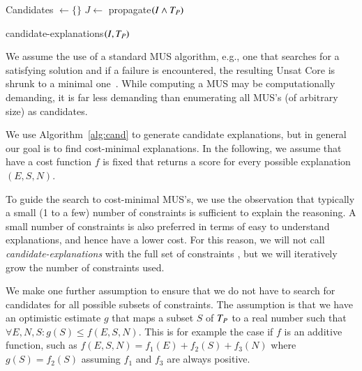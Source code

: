 \begin{algorithm}


  Candidates $\gets \{\}$\;
  $J \gets$ propagate$(I \wedge T_P)$\;
  \caption{candidate-explanations$(I,T_P)$}

  \label{alg:cand}
\end{algorithm}

We assume the use of a standard MUS algorithm, e.g., one that searches for a satisfying solution and if a failure is encountered, the resulting Unsat Core is shrunk to a minimal one~\cite{marques2010minimal}. While computing a MUS may be computationally demanding, it is far less demanding than enumerating all MUS's (of arbitrary size) as candidates.

We use Algorithm~\ref{alg:cand} to generate candidate explanations, but in general our goal is to find cost-minimal explanations. In the following, we assume that have a cost function $f$ is fixed that returns a score for every possible explanation $(E, S, N)$.

To guide the search to cost-minimal MUS's, we use the observation that typically a small (1 to a few) number of constraints is sufficient to explain the reasoning. A small number of constraints is also preferred in terms of easy to understand explanations, and hence have a lower cost. For this reason, we will  not call \textit{candidate-explanations} with the full set of constraints \allconstraints, but we will iteratively grow the number of constraints used.

We make one further assumption to ensure that we do not have to search for candidates for all possible subsets of constraints. The assumption is that we have an optimistic estimate $g$ that maps a subset $S$ of $T_P$ to a real number such that  $\forall E, N, S: g(S) \leq f(E, S, N)$. This is for example the case if $f$ is an additive function, such as $f(E, S, N) = f_1(E) + f_2(S) + f_3(N)$ where $g(S) = f_2(S)$ assuming $f_1$ and $f_3$ are always positive.

